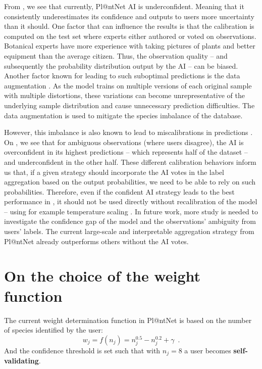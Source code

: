 From , we see that currently, Pl@ntNet AI is underconfident. Meaning that it consistently underestimates its confidence and outputs to users more uncertainty than it should.
One factor that can influence the results is that the calibration is computed on the test set where experts either authored or voted on observations.
Botanical experts have more experience with taking pictures of plants and better equipment than the average citizen.
Thus, the observation quality -- and subsequently the probability distribution output by the AI -- can be biased.
Another factor known for leading to such suboptimal predictions is the data augmentation \citep{kapoor2022uncertainty}. As the model trains on multiple versions of each original sample with multiple distortions, these variations can become unrepresentative of the underlying sample distribution and cause unnecessary prediction difficulties.
The data augmentation is used to mitigate the species imbalance of the database.

However, this imbalance is also known to lead to miscalibrations in predictions \citep{ao2023two}.
On , we see that for ambiguous observations (where users disagree), the AI is overconfident in its highest predictions -- which represents half of the dataset -- and underconfident in the other half.
These different calibration behaviors inform us that, if a given strategy should incorporate the AI votes in the label aggregation based on the output probabilities, we need to be able to rely on such probabilities.
Therefore, even if the confident AI strategy leads to the best performance in , it should not be used directly without recalibration of the model -- using for example temperature scaling \citep{guo_calibration_2017}.
In future work, more study is needed to investigate the confidence gap of the model and the observations' ambiguity from users' labels.
The current large-scale and interpretable aggregation strategy from Pl@ntNet already outperforms others without the AI votes.

\section{On the choice of the weight function}

The current weight determination function in Pl@ntNet is based on the number of species identified by the user:
\begin{equation}
    w_j = f(n_j) = n_j^{0.5} - n_j^{0.2} + \gamma \enspace.
\end{equation}
And the confidence threshold is set such that with $n_j=8$ a user becomes \textbf{self-validating}.


